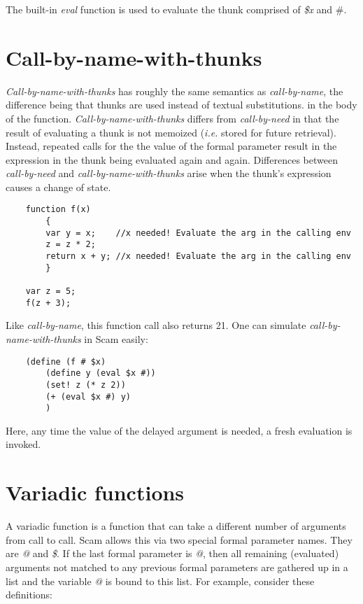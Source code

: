 The built-in {\it eval} function is used to evaluate the thunk
comprised of {\it \$x} and \#.

\section*{Call-by-name-with-thunks}

{\it Call-by-name-with-thunks} has roughly the same semantics
as {\it call-by-name}, the difference being
that thunks are used instead of textual substitutions.
in the body of the function. {\it Call-by-name-with-thunks} differs
from {\it call-by-need} in that the 
result of evaluating a thunk is not memoized ({\it i.e.} stored
for future retrieval). Instead, repeated
calls for the the value of the formal parameter result in the
expression in the thunk being evaluated again and again.
Differences between {\it call-by-need} and {\it call-by-name-with-thunks}
arise when the thunk's expression causes a change of state.

\begin{verbatim}
    function f(x)
        {
        var y = x;    //x needed! Evaluate the arg in the calling env
        z = z * 2;
        return x + y; //x needed! Evaluate the arg in the calling env
        }

    var z = 5;
    f(z + 3);
\end{verbatim}

Like {\it call-by-name}, this function call also returns 21. One can simulate
{\it call-by-name-with-thunks} in Scam easily:

\begin{verbatim}
    (define (f # $x)
        (define y (eval $x #))
        (set! z (* z 2))
        (+ (eval $x #) y)
        )
\end{verbatim}

Here, any time the value of the delayed argument is needed, a fresh
evaluation is invoked.

\section{Variadic functions}

A variadic function is a function that can take a different
number of arguments from call to call.
Scam allows this via two special formal parameter names.
They are {\it @} and {\it \$}.
If the last formal parameter is {\it @}, then all remaining
(evaluated) arguments not matched to any previous formal
parameters are gathered up in a list and the variable {\it @} is bound to this
list.  For example, consider these definitions:

